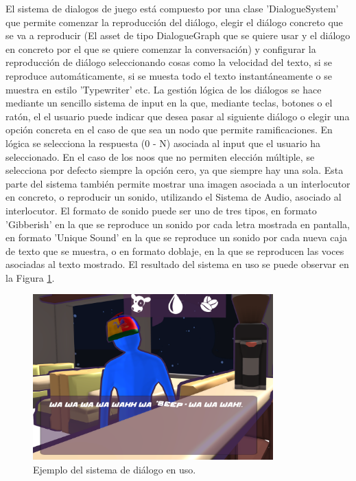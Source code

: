 El sistema de dialogos de juego está compuesto por una clase 'DialogueSystem' que permite comenzar la reproducción del diálogo, elegir el diálogo concreto que se va a reproducir (El asset de tipo DialogueGraph que 
se quiere usar y el diálogo en concreto por el que se quiere comenzar la conversación) y configurar la reproducción de diálogo seleccionando cosas como la velocidad del texto, si se reproduce automáticamente, si se 
muesta todo el texto instantáneamente o se muestra en estilo 'Typewriter' etc. La gestión lógica de los diálogos se hace mediante un sencillo sistema de input en la que, mediante teclas, botones o el ratón, el el usuario
puede indicar que desea pasar al siguiente diálogo o elegir una opción concreta en el caso de que sea un nodo que permite ramificaciones. En lógica se selecciona la respuesta (0 - N) asociada al input que el usuario ha 
seleccionado. En el caso de los noos que no permiten elección múltiple, se selecciona por defecto siempre la opción cero, ya que siempre hay una sola. Esta parte del sistema también permite mostrar una imagen asociada 
a un interlocutor en concreto, o reproducir un sonido, utilizando el Sistema de Audio, asociado al interlocutor. El formato de sonido puede ser uno de tres tipos, en formato 'Gibberish' en la que se reproduce un 
sonido por cada letra mostrada en pantalla, en formato 'Unique Sound' en la que se reproduce un sonido por cada nueva caja de texto que se muestra, o en formato doblaje, en la que se reproducen las voces asociadas 
al texto mostrado. El resultado del sistema en uso se puede observar en la Figura \ref{fig:dialogueExample}.

\begin{figure}[H]
  \centering
    \includegraphics[width=350px,clip=true]{dialogueExample.png}
  \caption{Ejemplo del sistema de diálogo en uso.}
  \label{fig:dialogueExample}
\end{figure}

